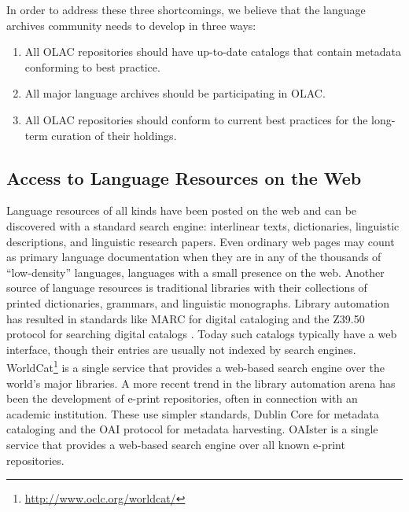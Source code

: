 
In order to address these three shortcomings, we believe that the
language archives community needs to develop in three ways:

\renewcommand{\labelenumi}{T-1.\arabic{enumi}}
\begin{enumerate}\setlength{\itemsep}{0pt}
\item All OLAC repositories should have up-to-date catalogs
      that contain metadata conforming to best practice.
\item All major language archives should be participating in OLAC.
\item All OLAC repositories should conform to current best practices
      for the long-term curation of their holdings.
\end{enumerate}

\subsection{Access to Language Resources on the Web}


Language resources of all kinds have been posted on the web and can be
discovered with a standard search engine: interlinear texts,
dictionaries, linguistic descriptions, and linguistic research papers.
Even ordinary web pages may count as primary language documentation
when they are in any of the thousands of ``low-density'' languages,
languages with a small presence on the web.  Another source of
language resources is traditional libraries with their collections of
printed dictionaries, grammars, and linguistic monographs.  Library
automation has resulted in standards like MARC for digital cataloging
\citep{MARC}
and the Z39.50 protocol for searching digital catalogs \citep{Z3950}.
Today such catalogs typically have a web interface, though their entries are
usually not indexed by search engines.
WorldCat\footnote{\scriptsize\url{http://www.oclc.org/worldcat/}} is a single service
that provides a web-based search engine over the world's major
libraries. A more recent trend in the library automation arena has
been the development of e-print repositories, often in connection with
an academic institution.  These use simpler standards, Dublin Core for
metadata cataloging and the OAI protocol for
metadata harvesting.  OAIster is a single service that provides a
web-based search engine over all known e-print repositories.


